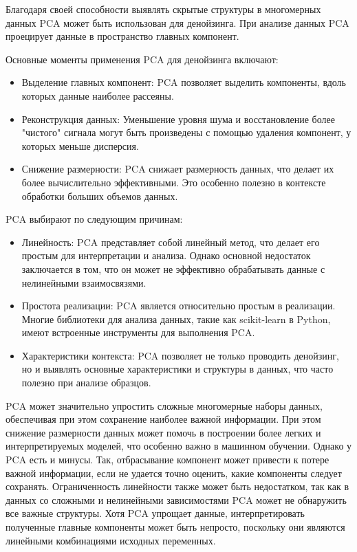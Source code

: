Благодаря своей способности выявлять скрытые структуры в многомерных данных PCA может быть использован для денойзинга. При анализе данных PCA проецирует данные в пространство главных компонент. 

Основные моменты применения PCA для денойзинга включают:
\begin{itemize}
\item Выделение главных компонент: 
PCA позволяет выделить компоненты, вдоль которых данные наиболее рассеяны.

\item Реконструкция данных: Уменьшение уровня шума и восстановление более "чистого" сигнала могут быть произведены с помощью удаления компонент, у которых меньше дисперсия. 

\item Снижение размерности: PCA снижает размерность данных, что делает их более вычислительно эффективными. Это особенно полезно в контексте обработки больших объемов данных.
\end{itemize}

PCA выбирают по следующим причинам:
\begin{itemize}
\item Линейность: PCA представляет собой линейный метод, что делает его простым для интерпретации и анализа. Однако основной недостаток заключается в том, что он может не эффективно обрабатывать данные с нелинейными взаимосвязями.

\item Простота реализации: PCA является относительно простым в реализации. Многие библиотеки для анализа данных, такие как scikit-learn в Python, имеют встроенные инструменты для выполнения PCA.

\item Характеристики контекста: PCA позволяет не только проводить денойзинг, но и выявлять основные характеристики и структуры в данных, что часто полезно при анализе образцов.
\end{itemize}

PCA может значительно упростить сложные многомерные наборы данных, обеспечивая при этом сохранение наиболее важной информации. При этом снижение размерности данных может помочь в построении более легких и интерпретируемых моделей, что особенно важно в машинном обучении.
Однако у PCA есть и минусы. Так, отбрасывание компонент может привести к потере важной информации, если не удается точно оценить, какие компоненты следует сохранять. Ограниченность линейности также может быть недостатком, так как в данных со сложными и нелинейными зависимостями PCA может не обнаружить все важные структуры. Хотя PCA упрощает данные, интерпретировать полученные главные компоненты может быть непросто, поскольку они являются линейными комбинациями исходных переменных.

